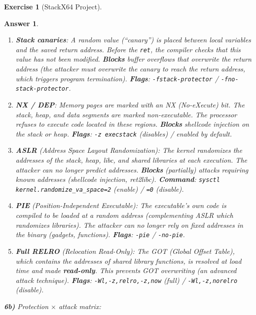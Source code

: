 \documentclass[a4paper,11pt]{article}
\theoremstyle{plain}
\newtheorem{correction}{Answer}
\theoremstyle{definition}
\newtheorem{exercice}{Exercise}
\begin{document}
\begin{exercice}[StackX64 Project]
\begin{correction}
\begin{enumerate}
\item \textbf{Stack canaries}: A random value (``canary'') is placed between local variables and the saved return address. Before the \texttt{ret}, the compiler checks that this value has not been modified. \textbf{Blocks} buffer overflows that overwrite the return address (the attacker must overwrite the canary to reach the return address, which triggers program termination). \textbf{Flags}: \texttt{-fstack-protector} / \texttt{-fno-stack-protector}.

\item \textbf{NX / DEP}: Memory pages are marked with an NX (No-eXecute) bit. The stack, heap, and data segments are marked non-executable. The processor refuses to execute code located in these regions. \textbf{Blocks} shellcode injection on the stack or heap. \textbf{Flags}: \texttt{-z execstack} (disables) / enabled by default.

\item \textbf{ASLR} (\textit{Address Space Layout Randomization}): The kernel randomizes the addresses of the stack, heap, libc, and shared libraries at each execution. The attacker can no longer predict addresses. \textbf{Blocks} (partially) attacks requiring known addresses (shellcode injection, ret2libc). \textbf{Command}: \texttt{sysctl kernel.randomize\_va\_space=2} (enable) / \texttt{=0} (disable).

\item \textbf{PIE} (\textit{Position-Independent Executable}): The executable's own code is compiled to be loaded at a random address (complementing ASLR which randomizes libraries). The attacker can no longer rely on fixed addresses in the binary (gadgets, functions). \textbf{Flags}: \texttt{-pie} / \texttt{-no-pie}.

\item \textbf{Full RELRO} (\textit{Relocation Read-Only}): The GOT (\textit{Global Offset Table}), which contains the addresses of shared library functions, is resolved at load time and made \textbf{read-only}. This prevents GOT overwriting (an advanced attack technique). \textbf{Flags}: \texttt{-Wl,-z,relro,-z,now} (full) / \texttt{-Wl,-z,norelro} (disable).
\end{enumerate}

\textbf{6b)} Protection $\times$ attack matrix:


\end{correction}
\end{exercice}
\end{document}
